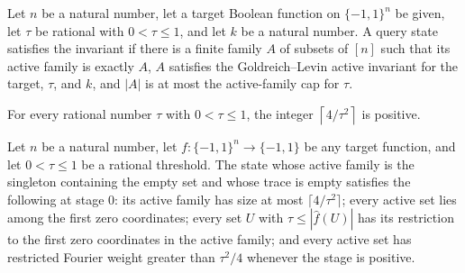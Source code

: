 \begin{definition}
\label{FABL.GoldreichLevinQueryState.SatisfiesInvariant}
\leanok
{}
Let $n$ be a natural number, let a target Boolean function on $\{−1,1\}^n$ be given,
let $\tau$ be rational with $0<\tau\leq1$, and let $k$ be a natural number. A query
state satisfies the invariant if there is a finite family $A$ of subsets of $[n]$ such
that its active family is exactly $A$, $A$ satisfies the Goldreich–Levin active
invariant for the target, $\tau$, and $k$, and $|A|$ is at most the active-family cap
for $\tau$.
\end{definition}

\begin{theorem}
\label{FABL.goldreichLevinActiveCap_pos}
\leanok
{}
For every rational number $\tau$ with $0<\tau\le 1$, the integer $\left\lceil
4/\tau^2\right\rceil$ is positive.
\end{theorem}

\begin{theorem}
\label{FABL.goldreichLevinInitialQueryState_satisfiesInvariant}
\leanok
{}
Let $n$ be a natural number, let $f:\{−1,1\}^n\to\{−1,1\}$ be any target function, and
let $0<\tau\le1$ be a rational threshold. The state whose active family is the singleton
containing the empty set and whose trace is empty satisfies the following at stage $0$:
its active family has size at most $\lceil4/\tau^2\rceil$; every active set lies among
the first zero coordinates; every set $U$ with $\tau\le|\widehat f(U)|$ has its
restriction to the first zero coordinates in the active family; and every active set has
restricted Fourier weight greater than $\tau^2/4$ whenever the stage is positive.
\end{theorem}

